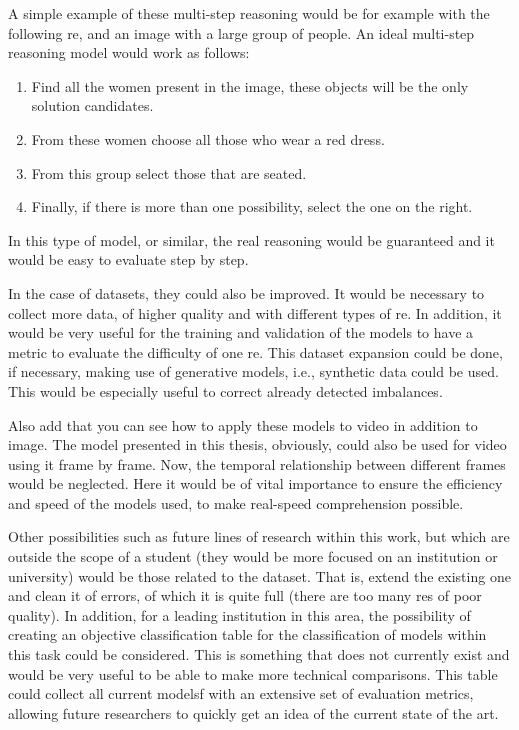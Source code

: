 \begin{exampleBox}
  A simple example of these multi-step reasoning would be for example with the
  following \gls{re},  and an image
  with a large group of people. An ideal multi-step reasoning model would work
  as follows:
  \begin{enumerate}
    \item Find all the women present in the image, these objects will be the only
    solution candidates.
    \item From these women choose all those who wear a red dress.
    \item From this group select those that are seated.
    \item Finally, if there is more than one possibility, select the one on the
    right.
  \end{enumerate}

  In this type of model, or similar, the real reasoning would be guaranteed and
  it would be easy to evaluate step by step.
\end{exampleBox}

In the case of datasets, they could also be improved. It would be necessary to
collect more data, of higher quality and with different types of \gls{re}. In
addition, it would be very useful for the training and validation of the models
to have a metric to evaluate the difficulty of one \gls{re}. This dataset
expansion could be done, if necessary, making use of generative models, i.e.,
synthetic data could be used. This would be especially useful to correct
already detected imbalances.

Also add that you can see how to apply these models to video in addition to
image. The model presented in this thesis, obviously, could also be used for
video using it frame by frame. Now, the temporal relationship between different
frames would be neglected. Here it would be of vital importance to ensure the
efficiency and speed of the models used, to make real-speed comprehension
possible.

Other possibilities such as future lines of research within this work, but
which are outside the scope of a student (they would be more focused on an
institution or university) would be those related to the dataset. That is,
extend the existing one and clean it of errors, of which it is quite full
(there are too many \glspl{re} of poor quality). In addition, for a leading
institution in this area, the possibility of creating an objective
classification table for the classification of models within this task could be
considered. This is something that does not currently exist and would be very
useful to be able to make more technical comparisons. This table could collect
all current modelsf with an extensive set of evaluation metrics, allowing
future researchers to quickly get an idea of the current state of the art.
